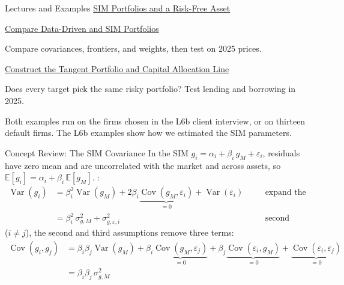 \documentclass[aspectratio=169,11pt]{beamer}
\newcommand{\E}{\mathbb{E}}
\newcommand{\Var}{\operatorname{Var}}
\newcommand{\Cov}{\operatorname{Cov}}
\newcommand{\repo}{https://github.com/varnerlab/CHEME-5660-CourseRepository-Fall-2026/blob/main/lectures/week-7/L7a}
\begin{document}
\begin{frame}{Lectures and Examples}
\textbf{}
\href{\repo/CHEME-5660-L7a-Lecture-SIM-Portfolio-RF-Fall-2026.ipynb}{SIM Portfolios and a Risk-Free Asset}

\vspace{0.8em}
\textbf{}
\href{\repo/CHEME-5660-L7a-Example-SIM-MinVar-RA-Fall-2026.ipynb}{Compare Data-Driven and SIM Portfolios}

Compare covariances, frontiers, and weights, then test on 2025 prices.

\vspace{0.8em}
\textbf{}
\href{\repo/CHEME-5660-L7a-Example-SIM-MinVar-RRFA-Fall-2026.ipynb}{Construct the Tangent Portfolio and Capital Allocation Line}

Does every target pick the same risky portfolio? Test lending and borrowing in 2025.

\vspace{0.8em}
Both examples run on the firms chosen in the L6b client interview, or on thirteen
default firms. The L6b examples show how we estimated the SIM parameters.
\end{frame}

\begin{frame}{Concept Review: The SIM Covariance}
  In the SIM $g_i=\alpha_i+\beta_i\,g_M+\varepsilon_i$, residuals have zero mean and are
  uncorrelated with the market and across assets, so $\E[g_i]=\alpha_i+\beta_i\,\E[g_M]$.
  :
  \[
    \begin{aligned}
      \Var(g_i)&=\beta_i^2\Var(g_M)+2\beta_i\underbrace{\Cov(g_M,\varepsilon_i)}_{=0}+\Var(\varepsilon_i)
        &&\quad\text{expand the SIM}\\
      &=\beta_i^2\,\sigma^2_{g,M}+\sigma^2_{g,\varepsilon,i}
        &&\quad\text{second assumption}
    \end{aligned}
  \]
   ($i\neq j$), the second and third assumptions remove three terms:
  \[
    \begin{aligned}
      \Cov(g_i,g_j)&=\beta_i\beta_j\Var(g_M)+\beta_i\underbrace{\Cov(g_M,\varepsilon_j)}_{=0}
        +\beta_j\underbrace{\Cov(\varepsilon_i,g_M)}_{=0}+\underbrace{\Cov(\varepsilon_i,\varepsilon_j)}_{=0}\\
      &=\beta_i\beta_j\,\sigma^2_{g,M}
    \end{aligned}
  \]
\end{frame}
\end{document}
